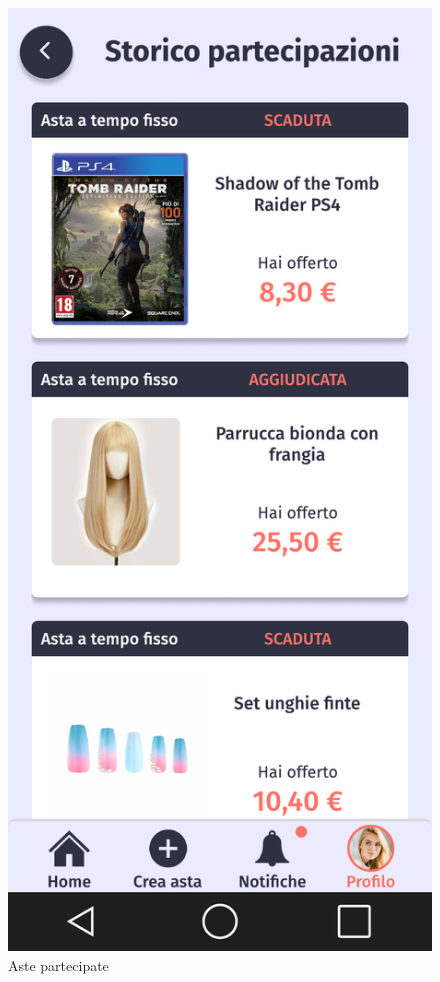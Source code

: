     \begin{figure}[!htb]
        \begin{minipage}{0.32\textwidth}
            \centering
            \includegraphics[width=.7\linewidth]{Immagini/Frames/Compratore/C15.pdf}
            \caption{Aste partecipate}
        \end{minipage}\hfill
        \begin{minipage}{0.32\textwidth}
            \centering

\end{minipage}
\end{figure}
